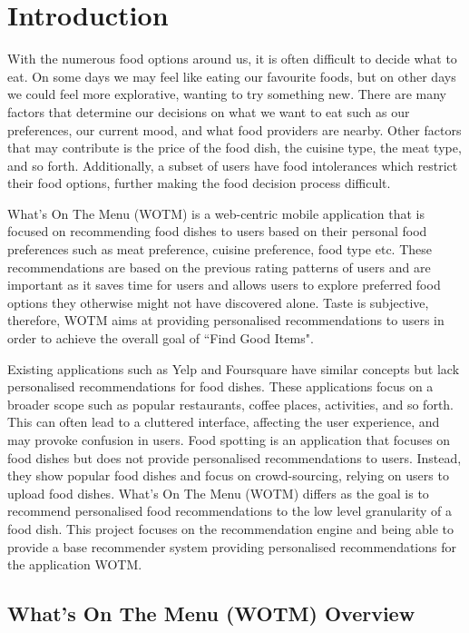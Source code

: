 \chapter{Introduction}\label{C:intro}

With the numerous food options around us, it is often difficult to decide what to eat. On some days we may feel like eating our favourite foods, but on other days we could feel more explorative, wanting to try something new. There are many factors that determine our decisions on what we want to eat such as our preferences, our current mood, and what food providers are nearby. Other factors that may contribute is the price of the food dish, the cuisine type, the meat type, and so forth. Additionally, a subset of users have food intolerances which restrict their food options, further making the food decision process difficult.

What’s On The Menu (WOTM) is a web-centric mobile application that is focused on recommending food dishes to users based on their personal food preferences such as meat preference, cuisine preference, food type etc. These recommendations are based on the previous rating patterns of users and are important as it saves time for users and allows users to explore preferred food options they otherwise might not have discovered alone. Taste is subjective, therefore, WOTM aims at providing personalised recommendations to users in order to achieve the overall goal of ``Find Good Items".

Existing applications such as Yelp \cite{yelp} and Foursquare \cite{foursquare} have similar concepts but lack personalised recommendations for food dishes. These applications focus on a broader scope such as popular restaurants, coffee places, activities, and so forth. This can often lead to a cluttered interface, affecting the user experience, and may provoke confusion in users. Food spotting is an application that focuses on food dishes but does not provide personalised recommendations to users. Instead, they show popular food dishes and focus on crowd-sourcing, relying on users to upload food dishes. What's On The Menu (WOTM) differs as the goal is to recommend personalised food recommendations to the low level granularity of a food dish. This project focuses on the recommendation engine and being able to provide a base recommender system providing personalised recommendations for the application WOTM.

\section{What's On The Menu (WOTM) Overview} \label{section:wotm}

